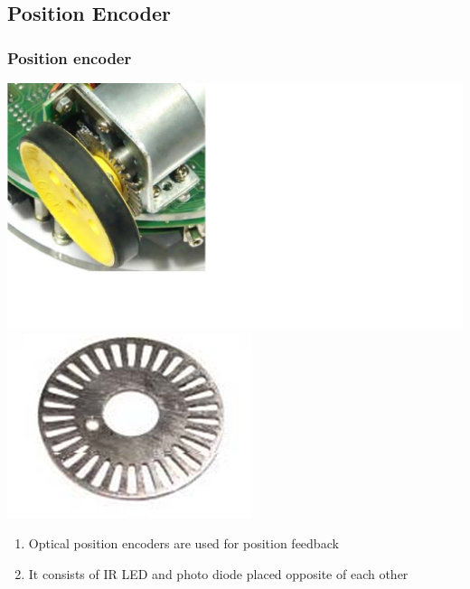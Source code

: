 \documentclass[table,10pt,red]{beamer}
\begin{document}
\subsection{Position Encoder}
	\begin{frame}[shrink = 8.9] 
		\frametitle{Position encoder} \pause
			\begin{minipage}[c]{0.4\textwidth}
				\includegraphics[width = 1.5\linewidth]{encoder_on_fb}\pause\\[10pt]
				\includegraphics[width = 0.8\linewidth]{slotted_disk}\\%
			\end{minipage}
			\pause
			\hfill
			\begin{minipage}[c]{0.5\textwidth}
				\begin{enumerate}
					\item <+-|alert@+> Optical position encoders are used for position feedback \\[5pt]
					\item <+-|alert@+> It consists of IR LED and photo diode placed opposite of each other \\[5pt]

\end{enumerate}
\end{minipage}
\end{frame}
\end{document}
